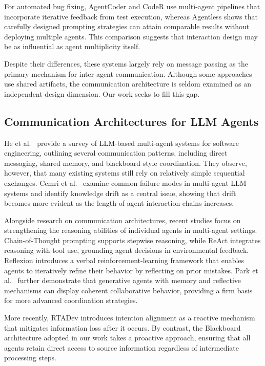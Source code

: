 \documentclass{ieeeaccess}
\begin{document}
For automated bug fixing, AgentCoder \cite{huang2024agentcoder} and CodeR \cite{chen2024coder} use multi-agent pipelines that incorporate iterative feedback from test execution, whereas Agentless \cite{xia2024agentless} shows that carefully designed prompting strategies can attain comparable results without deploying multiple agents. This comparison suggests that interaction design may be as influential as agent multiplicity itself.

Despite their differences, these systems largely rely on message passing as the primary mechanism for inter-agent communication. Although some approaches use shared artifacts, the communication architecture is seldom examined as an independent design dimension. Our work seeks to fill this gap.

\subsection{Communication Architectures for LLM Agents}

He et al.~\cite{he2025llm} provide a survey of LLM-based multi-agent systems for software engineering, outlining several communication patterns, including direct messaging, shared memory, and blackboard-style coordination. They observe, however, that many existing systems still rely on relatively simple sequential exchanges. Cemri et al.~\cite{cemri2025why} examine common failure modes in multi-agent LLM systems and identify knowledge drift as a central issue, showing that drift becomes more evident as the length of agent interaction chains increases.

Alongside research on communication architectures, recent studies focus on strengthening the reasoning abilities of individual agents in multi-agent settings. Chain-of-Thought prompting \cite{wei2022chain} supports stepwise reasoning, while ReAct \cite{yao2023react} integrates reasoning with tool use, grounding agent decisions in environmental feedback. Reflexion \cite{shinn2023reflexion} introduces a verbal reinforcement-learning framework that enables agents to iteratively refine their behavior by reflecting on prior mistakes. Park et al.~\cite{park2023generative} further demonstrate that generative agents with memory and reflective mechanisms can display coherent collaborative behavior, providing a firm basis for more advanced coordination strategies.

More recently, RTADev \cite{fang2025rtadev} introduces intention alignment as a reactive mechanism that mitigates information loss after it occurs. By contrast, the Blackboard architecture adopted in our work takes a proactive approach, ensuring that all agents retain direct access to source information regardless of intermediate processing steps.
\end{document}
